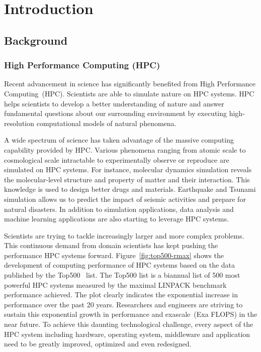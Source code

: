 \chapter{Introduction}

\section{Background}

\subsection{High Performance Computing (HPC)}

Recent advancement in science has significantly benefited from High Performance
Computing~(HPC). Scientists are able to simulate nature on HPC systems. HPC
helps scientists to develop a better understanding of nature and answer
fundamental questions about our surrounding environment by executing
high-resolution computational models of natural phenomena.

A wide spectrum of science has taken advantage of the massive computing
capability provided by HPC\@. Various phenomena ranging from atomic scale to
cosmological scale intractable to experimentally observe or reproduce are
simulated on HPC systems. For instance, molecular dynamics simulation reveals
the molecular-level structure and property of matter and their interaction.
This knowledge is used to design better drugs and materials. Earthquake and
Tsunami simulation allows us to predict the impact of seismic activities and
prepare for natural disasters. In addition to simulation applications, data
analysis and machine learning applications are also starting to leverage HPC
systems.

Scientists are trying to tackle increasingly larger and more complex problems.
This continuous demand from domain scientists has kept pushing the performance
HPC systems forward. Figure~\ref{fig:top500-rmax} shows the development of
computing performance of HPC systems based on the data published by the
Top500~\cite{top500} list. The Top500 list is a biannual list of 500 most
powerful HPC systems measured by the maximal LINPACK benchmark performance
achieved. The plot clearly indicates the exponential increase in performance
over the past 20 years. Researchers and engineers are striving to sustain this
exponential growth in performance and exascale~(Exa FLOPS) in the near future.
To achieve this daunting technological challenge, every aspect of the HPC
system including hardware, operating system, middleware and application need
to be greatly improved, optimized and even redesigned.

